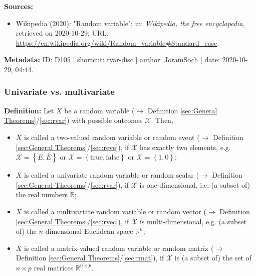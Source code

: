 \documentclass[a4paper,12pt,twoside]{book}
\begin{document}
\vspace{1em}
\textbf{Sources:}
\begin{itemize}
\item Wikipedia (2020): "Random variable"; in: \textit{Wikipedia, the free encyclopedia}, retrieved on 2020-10-29; URL: \url{https://en.wikipedia.org/wiki/Random_variable#Standard_case}.
\end{itemize}


\vspace{1em}
\textbf{Metadata:} ID: D105 | shortcut: rvar-disc | author: JoramSoch | date: 2020-10-29, 04:44.
\vspace{1em}



\subsubsection[\textit{Univariate vs. multivariate}]{Univariate vs. multivariate} \label{sec:rvar-uni}
\setcounter{equation}{0}

\textbf{Definition:} Let $X$ be a random variable ($\rightarrow$ Definition \ref{sec:General Theorems}/\ref{sec:rvar}) with possible outcomes $\mathcal{X}$. Then,

\begin{itemize}

\item $X$ is called a two-valued random variable or random event ($\rightarrow$ Definition \ref{sec:General Theorems}/\ref{sec:reve}), if $\mathcal{X}$ has exactly two elements, e.g. $\mathcal{X} = \left\lbrace E, \overline{E} \right\rbrace$ or $\mathcal{X} = \left\lbrace \mathrm{true}, \mathrm{false} \right\rbrace$ or $\mathcal{X} = \left\lbrace 1, 0 \right\rbrace$;

\item $X$ is called a univariate random variable or random scalar ($\rightarrow$ Definition \ref{sec:General Theorems}/\ref{sec:rvar}), if $\mathcal{X}$ is one-dimensional, i.e. (a subset of) the real numbers $\mathbb{R}$;

\item $X$ is called a multivariate random variable or random vector ($\rightarrow$ Definition \ref{sec:General Theorems}/\ref{sec:rvec}), if $\mathcal{X}$ is multi-dimensional, e.g. (a subset of) the $n$-dimensional Euclidean space $\mathbb{R}^n$;

\item $X$ is called a matrix-valued random variable or random matrix ($\rightarrow$ Definition \ref{sec:General Theorems}/\ref{sec:rmat}), if $\mathcal{X}$ is (a subset of) the set of $n \times p$ real matrices $\mathbb{R}^{n \times p}$.

\end{itemize}
\end{document}
